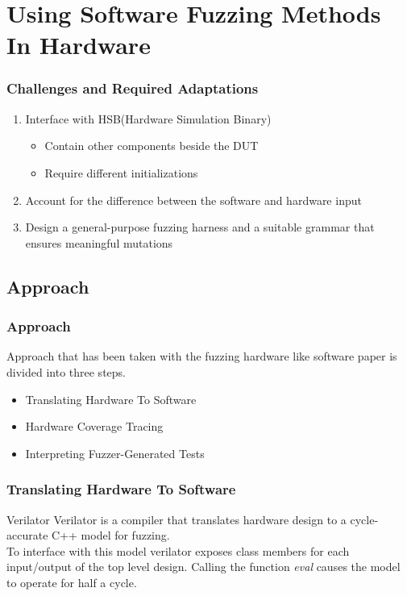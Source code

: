 \documentclass{beamer}
\begin{document}
\section{Using Software Fuzzing Methods In Hardware}
\begin{frame}
    \frametitle{Challenges and Required Adaptations}
    \begin{enumerate}
        \item Interface with HSB(Hardware Simulation Binary)
            \begin{itemize}
                \item Contain other components beside the DUT
                \item Require different initializations
            \end{itemize}
        \item Account for the difference between the software and hardware
            input
        \item Design a general-purpose fuzzing harness and a suitable grammar
            that ensures meaningful mutations
    \end{enumerate}
\end{frame}

\subsection{Approach}
\begin{frame}
    \frametitle{Approach}
    Approach that has been taken with the fuzzing hardware like software paper
    is divided into three steps.
    \begin{itemize}
        \item Translating Hardware To Software
        \item Hardware Coverage Tracing
        \item Interpreting Fuzzer-Generated Tests
    \end{itemize}
\end{frame}

\begin{frame}
    \frametitle{Translating Hardware To Software}
    \begin{block}{Verilator}
        Verilator is a compiler that translates hardware design to a
        cycle-accurate C++ model for fuzzing. \\
        To interface with this model verilator exposes class members for each
        input/output of the top level design. Calling the function
        \textit{eval} causes the model to operate for half a cycle.
    \end{block}
\end{frame}
\end{document}
